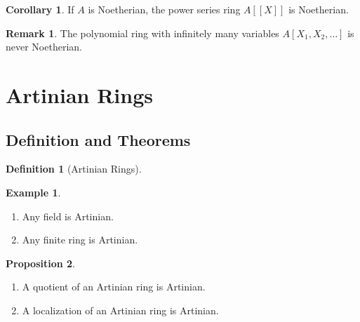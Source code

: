 \documentclass[a4paper]{book}
\theoremstyle{definition}
\newtheorem{definition}{Definition}[]
\newtheorem{example}{Example}[definition]
\newtheorem{corollary}{Corollary}
\newtheorem{proposition}[definition]{Proposition}
\newtheorem*{remark}{Remark}
\begin{document}
\begin{thmbox}
    \begin{corollary}
        If \(A\) is Noetherian, the power series ring \(A[[X]]\) is Noetherian.
    \end{corollary}
\end{thmbox}

\begin{rembox}
    \begin{remark}
        The polynomial ring with infinitely many variables \(A[X_1, X_2, \ldots]\) is never Noetherian.
    \end{remark}
\end{rembox}

\newpage
\section{Artinian Rings}

\subsection*{Definition and Theorems}

\begin{defbox}
    \begin{definition}[Artinian Rings]
        
    \end{definition}
\end{defbox}

\begin{exmbox}
    \begin{example}
        \begin{enumerate}
            \item Any field is Artinian.
            \item Any finite ring is Artinian.
        \end{enumerate}
    \end{example}
\end{exmbox}

\begin{thmbox}
    \begin{proposition}
        \begin{enumerate}
            \item A quotient of an Artinian ring is Artinian.
            \item A localization of an Artinian ring is Artinian.
        \end{enumerate}
    \end{proposition}
\end{thmbox}
\end{document}
